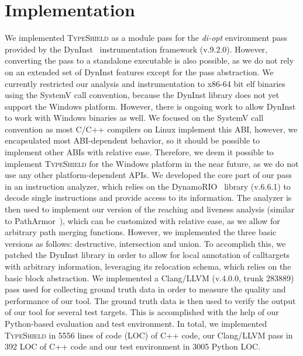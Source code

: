 \section{Implementation}
\label{chapter:Implementation}

We implemented \textsc{TypeShield} as a module pass for the \textit{di-opt} environment pass provided by the DynInst~\cite{bernat:dyninst} 
instrumentation framework (v.9.2.0). However, converting the pass to a standalone executable is also possible, as we do not rely on 
an extended set of DynInst features except for the pass abstraction. We currently restricted our analysis and instrumentation to x86-64 
bit elf binaries using the SystemV call convention, because the DynInst library does not yet support the
Windows platform. However, there is ongoing work to allow DynInst to work with Windows binaries as well. We focused on the SystemV call 
convention as most C/C++ compilers on Linux implement this ABI, however, we encapsulated most ABI-dependent behavior, so it should be 
possible to implement other ABIs with relative ease. Therefore, we deem it possible to implement \textsc{TypeShield} for the Windows 
platform in the near future, as we do not use any other platform-dependent APIs. We developed the core part of our pass in an instruction
analyzer, which relies on the DynamoRIO~\cite{dynamorio:drmemory} library (v.6.6.1) to decode single instructions and provide access to
its information. The analyzer is then used to implement our version of the reaching and liveness analysis (similar to PathArmor~\cite{veen:typearmor}), 
which can be customized with relative ease, as we allow for arbitrary path merging functions. However, we implemented the three basic versions as 
follows: destructive, intersection and union. To accomplish this, we patched the DynInst library in order to allow for local annotation of 
calltargets with arbitrary information, leveraging its relocation schema, which relies on the basic block abstraction. We implemented a 
Clang/LLVM (v.4.0.0, trunk 283889) pass used for 
collecting ground truth data in order to measure the quality and performance of our tool. The ground truth data is then used to verify 
the output of our tool for several test targets. This is accomplished with the help of our Python-based evaluation and test environment. 
In total, we implemented \textsc{TypeShield} in 5556 lines of code (LOC) of C++ code, our Clang/LLVM pass in 392 LOC
of C++ code and our test environment in 3005 Python LOC. 


